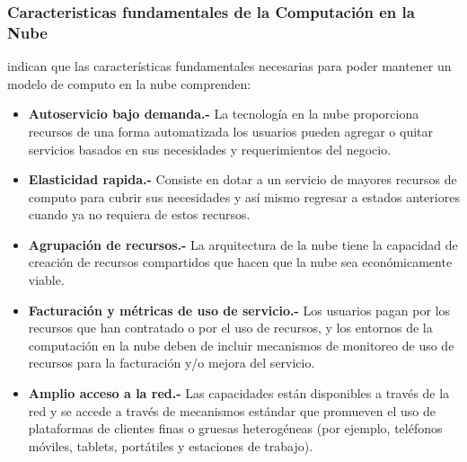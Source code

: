 \subsubsection{Caracteristicas fundamentales de la Computación en la Nube}
\cite{nist} indican que las características fundamentales necesarias para poder
mantener un modelo de computo en la nube comprenden:
\begin{itemize}
    \item \textbf{Autoservicio bajo demanda.-} La tecnología en la nube
          proporciona recursos de una forma automatizada los usuarios pueden
          agregar o quitar servicios basados en sus necesidades y requerimientos
          del negocio.
    \item \textbf{Elasticidad rapida.-} Consiste en dotar a un servicio de mayores
          recursos de computo para cubrir sus necesidades y así mismo regresar
          a estados anteriores cuando ya no requiera de estos recursos.
    \item \textbf{Agrupación de recursos.-} La arquitectura de la nube tiene la capacidad
          de creación de recursos compartidos que hacen que la nube sea
          económicamente viable.
    \item \textbf{Facturación y métricas de uso de servicio.-} Los usuarios
          pagan por los recursos que han contratado o por el uso de recursos, y
          los entornos de la computación en la nube deben de incluir mecanismos de monitoreo
          de uso de recursos para la facturación y/o mejora del servicio.
    \item \textbf{Amplio acceso a la red.-} Las capacidades están disponibles
          a través de la red y se accede a través de mecanismos estándar
          que promueven el uso de plataformas de clientes finas o gruesas
          heterogéneas (por ejemplo, teléfonos móviles, tablets, portátiles
          y estaciones de trabajo).
\end{itemize}
